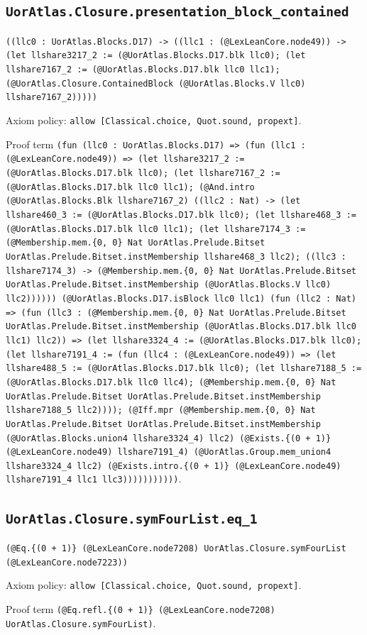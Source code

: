 \documentclass[11pt]{article}
\begin{document}
\subsection*{\texttt{UorAtlas.Closure.presentation\_block\_contained}}
\noindent\texttt{((llc0 : UorAtlas.Blocks.D17) -> ((llc1 : (@LexLeanCore.node49)) -> (let llshare3217\_2 := (@UorAtlas.Blocks.D17.blk llc0); (let llshare7167\_2 := (@UorAtlas.Blocks.D17.blk llc0 llc1); (@UorAtlas.Closure.ContainedBlock (@UorAtlas.Blocks.V llc0) llshare7167\_2)))))}\par
\noindent Axiom policy: \texttt{allow [Classical.choice, Quot.sound, propext]}.\par
\noindent Proof term \texttt{(fun (llc0 : UorAtlas.Blocks.D17) => (fun (llc1 : (@LexLeanCore.node49)) => (let llshare3217\_2 := (@UorAtlas.Blocks.D17.blk llc0); (let llshare7167\_2 := (@UorAtlas.Blocks.D17.blk llc0 llc1); (@And.intro (@UorAtlas.Blocks.Blk llshare7167\_2) ((llc2 : Nat) -> (let llshare460\_3 := (@UorAtlas.Blocks.D17.blk llc0); (let llshare468\_3 := (@UorAtlas.Blocks.D17.blk llc0 llc1); (let llshare7174\_3 := (@Membership.mem.\{0, 0\} Nat UorAtlas.Prelude.Bitset UorAtlas.Prelude.Bitset.instMembership llshare468\_3 llc2); ((llc3 : llshare7174\_3) -> (@Membership.mem.\{0, 0\} Nat UorAtlas.Prelude.Bitset UorAtlas.Prelude.Bitset.instMembership (@UorAtlas.Blocks.V llc0) llc2)))))) (@UorAtlas.Blocks.D17.isBlock llc0 llc1) (fun (llc2 : Nat) => (fun (llc3 : (@Membership.mem.\{0, 0\} Nat UorAtlas.Prelude.Bitset UorAtlas.Prelude.Bitset.instMembership (@UorAtlas.Blocks.D17.blk llc0 llc1) llc2)) => (let llshare3324\_4 := (@UorAtlas.Blocks.D17.blk llc0); (let llshare7191\_4 := (fun (llc4 : (@LexLeanCore.node49)) => (let llshare488\_5 := (@UorAtlas.Blocks.D17.blk llc0); (let llshare7188\_5 := (@UorAtlas.Blocks.D17.blk llc0 llc4); (@Membership.mem.\{0, 0\} Nat UorAtlas.Prelude.Bitset UorAtlas.Prelude.Bitset.instMembership llshare7188\_5 llc2)))); (@Iff.mpr (@Membership.mem.\{0, 0\} Nat UorAtlas.Prelude.Bitset UorAtlas.Prelude.Bitset.instMembership (@UorAtlas.Blocks.union4 llshare3324\_4) llc2) (@Exists.\{(0 + 1)\} (@LexLeanCore.node49) llshare7191\_4) (@UorAtlas.Group.mem\_union4 llshare3324\_4 llc2) (@Exists.intro.\{(0 + 1)\} (@LexLeanCore.node49) llshare7191\_4 llc1 llc3)))))))))))}.\par
\subsection*{\texttt{UorAtlas.Closure.symFourList.eq\_1}}
\noindent\texttt{(@Eq.\{(0 + 1)\} (@LexLeanCore.node7208) UorAtlas.Closure.symFourList (@LexLeanCore.node7223))}\par
\noindent Axiom policy: \texttt{allow [Classical.choice, Quot.sound, propext]}.\par
\noindent Proof term \texttt{(@Eq.refl.\{(0 + 1)\} (@LexLeanCore.node7208) UorAtlas.Closure.symFourList)}.\par
\end{document}
